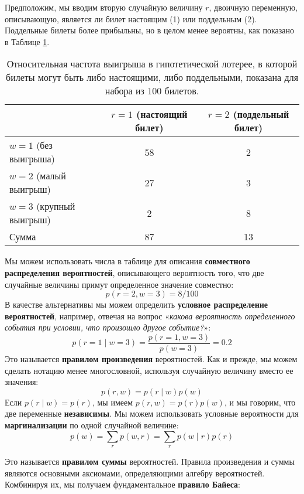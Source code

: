 Предположим, мы вводим вторую случайную величину $r$, двоичную переменную, описывающую, является ли билет настоящим (1) или поддельным (2). Поддельные билеты более прибыльны, но в целом менее вероятны, как показано в Таблице \ref{tab:lottery_tickets}.
%
\begin{table}[h]
\centering
\caption{Относительная частота выигрыша в гипотетической лотерее, в которой билеты могут быть либо настоящими, либо поддельными, показана для набора из $100$ билетов.}
\label{tab:lottery_tickets}
\begin{tabular}{@{}lcc@{}}
\toprule
 & $r=1$ (настоящий билет) & $r=2$ (поддельный билет) \\ \midrule
$w=1$ (без выигрыша) & 58 & 2 \\
$w=2$ (малый выигрыш) & 27 & 3 \\
$w=3$ (крупный выигрыш) & 2 & 8 \\ \midrule
Сумма & 87 & 13 \\ \bottomrule
\end{tabular}
\end{table}

Мы можем использовать числа в таблице для описания \textbf{совместного распределения вероятностей}, описывающего вероятность того, что две случайные величины примут определенное значение совместно:
%
$$
p(r=2,w=3)=8/100
$$
%
В качестве альтернативы мы можем определить \textbf{условное распределение вероятностей}, например, отвечая на вопрос «\textit{какова вероятность определенного события при условии, что произошло другое событие?}»:
%
$$
p(r=1 \mid w=3) = \frac{p(r=1, w=3)}{p(w=3)} = 0.2
$$
%
Это называется \textbf{правилом произведения} вероятностей. Как и прежде, мы можем сделать нотацию менее многословной, используя случайную величину вместо ее значения:
%
\begin{equation}
p(r,w)=p(r\mid w)p(w)
\label{eq:product_rule}
\end{equation}
%
Если $p(r \mid w)=p(r)$, мы имеем $p(r,w)=p(r)p(w)$, и мы говорим, что две переменные \textbf{независимы}. Мы можем использовать условные вероятности для \textbf{маргинализации} по одной случайной величине:
%
\begin{equation}
p(w)=\sum_{r} p(w,r) = \sum_r p(w \mid r)p(r)
\label{eq:sum_rule}
\end{equation}

Это называется \textbf{правилом суммы} вероятностей. Правила произведения и суммы являются основными аксиомами, определяющими алгебру вероятностей. Комбинируя их, мы получаем фундаментальное \textbf{правило Байеса}:

